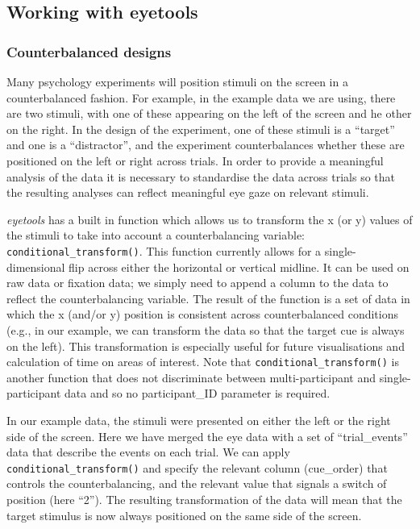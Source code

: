 \documentclass[
  man,
  floatsintext,
  longtable,
  nolmodern,
  notxfonts,
  notimes,
  colorlinks=true,linkcolor=blue,citecolor=blue,urlcolor=blue]{apa7}
\begin{document}
\subsection{Working with eyetools}\label{working-with-eyetools}

\subsubsection{Counterbalanced designs}\label{counterbalanced-designs}

Many psychology experiments will position stimuli on the screen in a
counterbalanced fashion. For example, in the example data we are using,
there are two stimuli, with one of these appearing on the left of the
screen and he other on the right. In the design of the experiment, one
of these stimuli is a ``target'' and one is a ``distractor'', and the
experiment counterbalances whether these are positioned on the left or
right across trials. In order to provide a meaningful analysis of the
data it is necessary to standardise the data across trials so that the
resulting analyses can reflect meaningful eye gaze on relevant stimuli.

\emph{eyetools} has a built in function which allows us to transform the
x (or y) values of the stimuli to take into account a counterbalancing
variable: \texttt{conditional\_transform()}. This function currently
allows for a single-dimensional flip across either the horizontal or
vertical midline. It can be used on raw data or fixation data; we simply
need to append a column to the data to reflect the counterbalancing
variable. The result of the function is a set of data in which the x
(and/or y) position is consistent across counterbalanced conditions
(e.g., in our example, we can transform the data so that the target cue
is always on the left). This transformation is especially useful for
future visualisations and calculation of time on areas of interest. Note
that \texttt{conditional\_transform()} is another function that does not
discriminate between multi-participant and single-participant data and
so no participant\_ID parameter is required.

In our example data, the stimuli were presented on either the left or
the right side of the screen. Here we have merged the eye data with a
set of ``trial\_events'' data that describe the events on each trial. We
can apply \texttt{conditional\_transform()} and specify the relevant
column (cue\_order) that controls the counterbalancing, and the relevant
value that signals a switch of position (here ``2''). The resulting
transformation of the data will mean that the target stimulus is now
always positioned on the same side of the screen.
\end{document}
